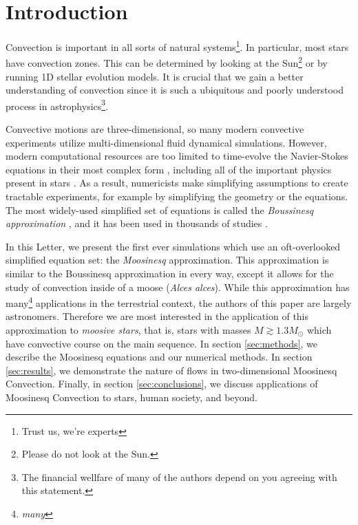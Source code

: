 \section{Introduction}
\label{sec:introduction}

Convection is important in all sorts of natural systems\footnote{Trust us, we're experts}.
In particular, most stars have convection zones.
This can be determined by looking at the Sun\footnote{Please do not look at the Sun.} or by running 1D stellar evolution models.
It is crucial that we gain a better understanding of convection since it is such a ubiquitous and poorly understood process in astrophysics\footnote{The financial wellfare of many of the authors depend on you agreeing with this statement.}.

Convective motions are three-dimensional, so many modern convective experiments utilize multi-dimensional fluid dynamical simulations.
However, modern computational resources are too limited to time-evolve the Navier-Stokes equations in their most complex form \citep{landau}, including all of the important physics present in stars \citep{Paxton2011, Paxton2013, Paxton2015, Paxton2018, Paxton2019}.
As a result, numericists make simplifying assumptions to create tractable experiments, for example by simplifying the geometry or the equations.
The most widely-used simplified set of equations is called the \emph{Boussinesq approximation} \citep{spiegel_veronis_1960}, and it has been used in thousands of studies \citep[see e.g.,][]{ahlers_etal_2009}.

In this Letter, we present the first ever simulations which use an oft-overlooked simplified equation set: the \emph{Moosinesq} approximation.
This approximation is similar to the Boussinesq approximation in every way, except it allows for the study of convection inside of a moose (\emph{Alces alces}).
While this approximation has many\footnote{\emph{many}} applications in the terrestrial context, the authors of this paper are largely astronomers.
Therefore we are most interested in the application of this approximation to \emph{moosive stars}, that is, stars with masses $M \gtrsim 1.3 M_\odot$ which have convective course on the main sequence.
In section \ref{sec:methods}, we describe the Moosinesq equations and our numerical methods.
In section \ref{sec:results}, we demonstrate the nature of flows in two-dimensional Moosinesq Convection.
Finally, in section \ref{sec:conclusions}, we discuss applications of Moosinesq Convection to stars, human society, and beyond.
